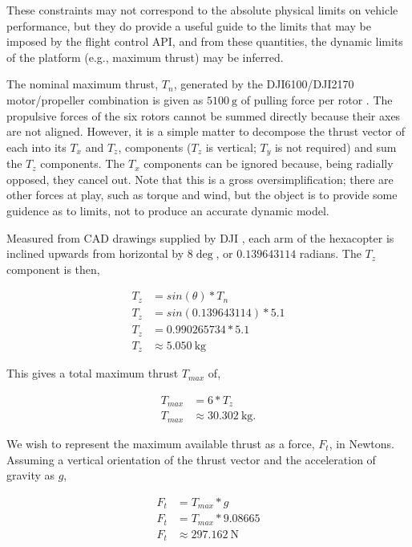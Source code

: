 \documentclass[doc]{apa6}
\begin{document}
These constraints may not correspond to the absolute physical limits on vehicle performance, but they do provide a useful guide to the limits that may be imposed by the flight control API, and from these quantities, the dynamic limits of the platform (e.g., maximum thrust) may be inferred.

The nominal maximum thrust, $T_n$, generated by the DJI6100/DJI2170 motor/propeller combination is given as $\SI{5100}\g$ of pulling force per rotor \parencite{DJI2017}. The propulsive forces of the six rotors cannot be summed directly because their axes are not aligned. However, it is a simple matter to decompose the thrust vector of each into its $T_x$ and $T_z$, components ($T_z$ is vertical; $T_y$ is not required) and sum the $T_z$ components. The $T_x$ components can be ignored because, being radially opposed, they cancel out. Note that this is a gross oversimplification; there are other forces at play, such as torque and wind, but the object is to provide some guidence as to limits, not to produce an accurate dynamic model.

Measured from CAD drawings supplied by DJI \parencite{DJI2017}, each arm of the hexacopter is inclined upwards from horizontal by $8\deg$, or $0.139643114$ radians. The $T_z$ component is then,

\begin{equation}
\begin{split}
T_z &= sin(\theta) * T_n \\
T_z &= sin(0.139643114) * 5.1 \\
T_z &= 0.990265734 * 5.1 \\
T_z &\approx \SI{5.050}{\kg} %
\end{split}
\end{equation}

This gives a total maximum thrust $T_{max}$ of,

\begin{equation}
\begin{split}
T_{max} &= 6 * T_z \\
T_{max} &\approx \SI{30.302}{\kg}.
\end{split}
\end{equation} 

We wish to represent the maximum available thrust as a force, $F_t$, in Newtons. Assuming a vertical orientation of the thrust vector and the acceleration of gravity as $g$, 

\begin{equation}
\begin{split}
F_t &= T_{max} * g \\
F_t &= T_{max} * 9.08665 \\
F_t &\approx \SI{297.162}{\N}
\end{split}
\end{equation}
\end{document}
